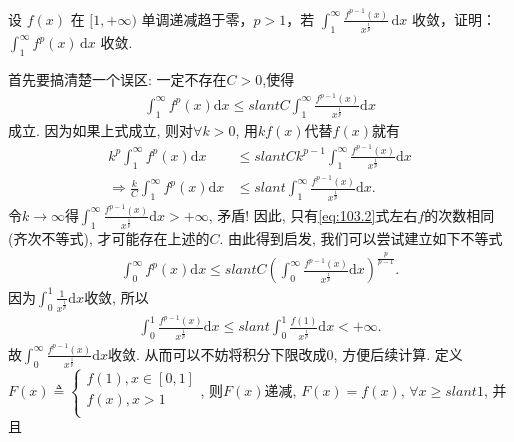 \documentclass[../../main.tex]{subfiles}
\begin{document}
\begin{example}
设 $f(x)$ 在 $[1,+\infty)$ 单调递减趋于零，$p>1$，若 $\int_{1}^{\infty}\frac{f^{p-1}(x)}{x^{\frac{1}{p}}}\,\mathrm{d}x$ 收敛，证明：$\int_{1}^{\infty}f^{p}(x)\,\mathrm{d}x$ 收敛.
\end{example}
\begin{note}
首先要搞清楚一个误区: 一定不存在$C>0$,使得
\begin{align}\label{eq:103.2}
\int_1^{\infty}{f^p\left( x \right)}\mathrm{d}x\leqslant slant C\int_1^{\infty}{\frac{f^{p-1}\left( x \right)}{x^{\frac{1}{p}}}\mathrm{d}x}
\end{align}
成立. 因为如果上式成立, 则对$\forall k>0$, 用$kf\left( x \right)$代替$f\left( x \right)$就有
\begin{align*}
k^p\int_1^{\infty}{f^p\left( x \right)}\mathrm{d}x&\leqslant slant Ck^{p-1}\int_1^{\infty}{\frac{f^{p-1}\left( x \right)}{x^{\frac{1}{p}}}\mathrm{d}x}\\
\Rightarrow \frac{k}{C}\int_1^{\infty}{f^p\left( x \right)}\mathrm{d}x&\leqslant slant \int_1^{\infty}{\frac{f^{p-1}\left( x \right)}{x^{\frac{1}{p}}}\mathrm{d}x}.
\end{align*}
令$k\rightarrow \infty$得$\int_1^{\infty}{\frac{f^{p-1}\left( x \right)}{x^{\frac{1}{p}}}\mathrm{d}x}>+\infty$, 矛盾!
因此, 只有\eqref{eq:103.2}式左右$f$的次数相同(齐次不等式), 才可能存在上述的$C$.
由此得到启发, 我们可以尝试建立如下不等式
\begin{align*}
\int_0^{\infty}{f^p\left( x \right)}\mathrm{d}x\leqslant slant C\left( \int_0^{\infty}{\frac{f^{p-1}\left( x \right)}{x^{\frac{1}{p}}}\mathrm{d}x} \right) ^{\frac{p}{p-1}}.
\end{align*}
因为$\int_0^1{\frac{1}{x^{\frac{1}{p}}}\mathrm{d}x}$收敛, 所以
\begin{align*}
\int_0^1{\frac{f^{p-1}\left( x \right)}{x^{\frac{1}{p}}}\mathrm{d}x}\leqslant slant \int_0^1{\frac{f\left( 1 \right)}{x^{\frac{1}{p}}}\mathrm{d}x}<+\infty .
\end{align*}
故$\int_0^{\infty}{\frac{f^{p-1}\left( x \right)}{x^{\frac{1}{p}}}\mathrm{d}x}$收敛. 从而可以不妨将积分下限改成$0$, 方便后续计算.
定义$F\left( x \right) \triangleq \begin{cases}
	f\left( 1 \right) ,x\in \left[ 0,1 \right]\\
	f\left( x \right) ,x>1\\
\end{cases}$, 则$F\left( x \right) $递减, $F\left( x \right) =f\left( x \right) $, $\forall x\geqslant slant 1$, 并且
\begin{align*}

\end{align*}
\end{note}
\end{document}
